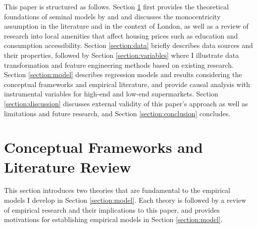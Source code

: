 \documentclass{article}
\begin{document}
This paper is structured as follows. Section \ref{section:lit} first provides the theoretical foundations of seminal models by \citet{AlonsoWilliam1964Lalu} and \citet{Rosen1984} and discusses the monocentricity assumption in the literature and in the context of London, as well as a review of research into local amenities that affect housing prices such as education and consumption accessibility. Section \ref{section:data} briefly describes data sources and their properties, followed by Section \ref{section:variables} where I illustrate data transformation and feature engineering methods based on existing research. Section \ref{section:model} describes regression models and results considering the conceptual frameworks and empirical literature, and provide causal analysis with instrumental variables for high-end and low-end supermarkets. Section \ref{section:discussion} discusses external validity of this paper's approach as well as limitations and future research, and Section \ref{section:conclusion} concludes.

\section{Conceptual Frameworks and Literature Review} \label{section:lit}
This section introduces two theories that are fundamental to the empirical models I develop in Section \ref{section:model}. Each theory is followed by a review of empirical research and their implications to this paper, and provides motivations for establishing empirical models in Section \ref{section:model}.
\end{document}
